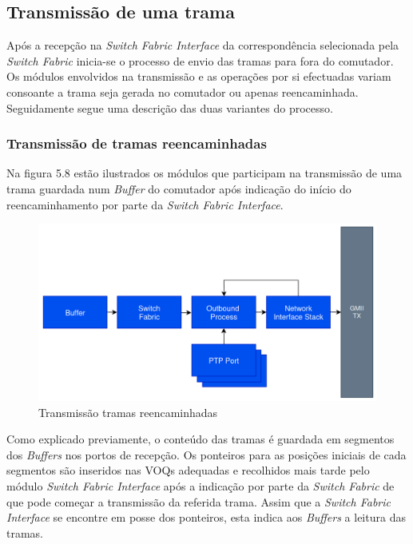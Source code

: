 \subsection{Transmissão de uma trama}

Após a recepção na \textit{Switch Fabric Interface} da correspondência selecionada pela \textit{Switch Fabric} inicia-se o processo de envio das tramas para fora do comutador. Os módulos envolvidos na transmissão e as operações por si efectuadas variam consoante a trama seja gerada no comutador ou apenas reencaminhada. Seguidamente segue uma descrição das duas variantes do processo.

\subsubsection{Transmissão de tramas reencaminhadas}

Na figura 5.8 estão ilustrados os módulos que participam na transmissão de uma trama guardada num \textit{Buffer} do comutador após indicação do início do reencaminhamento por parte da \textit{Switch Fabric Interface}.

\begin{figure}[H]
  \centering
  \includegraphics[width=1 \textwidth]{Outbound_Normal.png}
  \caption[Transmissão de tramas reencaminhadas]{Transmissão tramas reencaminhadas}
  \label{fig:airbus1}
\end{figure} 

Como explicado previamente, o conteúdo das tramas é guardada em segmentos dos \textit{Buffers} nos portos de recepção. Os ponteiros para as posições iniciais de cada segmentos são inseridos nas VOQs adequadas e recolhidos mais tarde pelo módulo \textit{Switch Fabric Interface} após a indicação por parte da \textit{Switch Fabric} de que pode começar a transmissão da referida trama. Assim que a \textit{Switch Fabric Interface} se encontre em posse dos ponteiros, esta indica aos \textit{Buffers} a leitura das tramas. \par 


